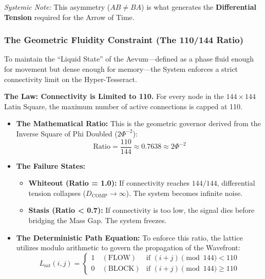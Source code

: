 \documentclass[11pt, letterpaper]{article}
\begin{document}
\textit{Systemic Note:} This asymmetry ($AB \neq BA$) is what generates the \textbf{Differential Tension} required for the Arrow of Time.

\subsubsection*{The Geometric Fluidity Constraint (The 110\slash 144 Ratio)}\label{sec:5.5}
To maintain the ``Liquid State'' of the Aevum---defined as a phase fluid enough for movement but dense enough for memory---the System enforces a strict connectivity limit on the Hyper-Tesseract.

\vspace{1em}
\textbf{The Law: Connectivity is Limited to 110.}
For every node in the $144 \times 144$ Latin Square, the maximum number of active connections is capped at 110.

\begin{itemize}
    \item \textbf{The Mathematical Ratio:} This is the geometric governor derived from the Inverse Square of Phi Doubled ($2\Phi^{-2}$):
    \begin{equation}
        \text{Ratio} = \frac{110}{144} \approx 0.7638 \approx 2\Phi^{-2}
    \end{equation}

    \item \textbf{The Failure States:}
    \begin{itemize}
        \item \textbf{Whiteout (Ratio = 1.0):} If connectivity reaches $144\slash 144$, differential tension collapses ($D_{\text{COMP}} \to \infty$). The system becomes infinite noise.
        \item \textbf{Stasis (Ratio < 0.7):} If connectivity is too low, the signal dies before bridging the Mass Gap. The system freezes.
    \end{itemize}

    \item \textbf{The Deterministic Path Equation:}
    To enforce this ratio, the lattice utilizes modulo arithmetic to govern the propagation of the Wavefront:
    \begin{equation}
        L_{\text{sat}}(i,j) = 
        \begin{cases} 
        1 \quad (\text{FLOW}) & \text{if } (i+j) \pmod{144} < 110 \\
        0 \quad (\text{BLOCK}) & \text{if } (i+j) \pmod{144} \ge 110 
        \end{cases}
    \end{equation}
\end{itemize}
\end{document}
